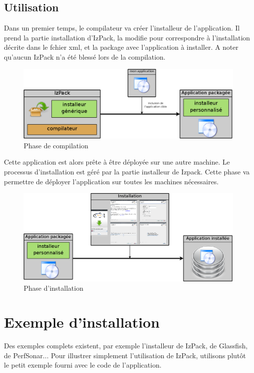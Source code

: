 \subsection{Utilisation}
Dans un premier temps, le compilateur va créer l'installeur de l'application.
Il prend la partie installation d'IzPack, la modifie pour correspondre à l'installation décrite dans le fchier xml, et la package avec l'application à installer.
A noter qu'aucun IzPack n'a été blessé lors de la compilation.
\begin{figure}[H]
	\centering
	\includegraphics[width=\textwidth]{../image/partie_compil.png}
	\caption{Phase de compilation}
\end{figure}

Cette application est alors prête à être déployée sur une autre machine.
Le processus d'installation est géré par la partie installeur de Izpack. Cette phase va permettre de déployer l'application sur toutes les machines nécessaires.
\begin{figure}[H]
	\centering
	\includegraphics[width=\textwidth]{../image/partie_install.png}
	\caption{Phase d'installation}
\end{figure}

\section{Exemple d'installation}
Des exemples complets existent, par exemple l'installeur de IzPack, de Glassfish, de PerfSonar... 
Pour illustrer simplement l'utilisation de IzPack, utilisons plutôt le petit exemple fourni avec le code de l'application.
